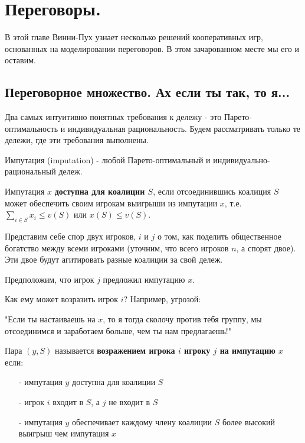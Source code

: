 \section{Переговоры.}

В этой главе Винни-Пух узнает несколько решений кооперативных игр, основанных на моделировании переговоров. В этом зачарованном месте мы его и оставим.

\subsection{Переговорное множество. Ах если ты так, то я...}

Два самых интуитивно понятных требования к дележу - это Парето-оптимальность и индивидуальная рациональность. Будем рассматривать только те дележи, где эти требования выполнены.

\begin{definition} Импутация (imputation) - любой Парето-оптимальный и индивидуально-рациональный дележ.
\end{definition}

\begin{definition}
Импутация $x$ \textbf{доступна для коалиции $S$}, если отсоединившись коалиция $S$ может обеспечить своим игрокам выигрыши из импутации $x$, т.е. $\sum_{i\in S}x_{i}\leq v(S)$ или $x(S)\leq v(S)$.
\end{definition}

Представим себе спор двух игроков, $i$ и $j$ о том, как поделить общественное богатство между всеми игроками (уточним, что всего игроков $n$, а спорят двое). Эти двое будут агитировать разные коалиции за свой дележ.

Предположим, что игрок $j$ предложил импутацию $x$. 

Как ему может возразить игрок $i$? Например, угрозой:

"Если ты настаиваешь на $x$, то я тогда сколочу против тебя группу, мы отсоединимся и заработаем больше, чем ты нам предлагаешь!"

\begin{definition}
Пара $(y,S)$ называется \textbf{возражением игрока $i$ игроку $j$ на импутацию $x$} если:
\begin{itemize}
\item[-] импутация $y$ доступна для коалиции $S$
\item[-] игрок $i$ входит в $S$, а $j$ не входит в $S$
\item[-] импутация $y$ обеспечивает каждому члену коалиции $S$ более высокий выигрыш чем импутация $x$
\end{itemize}
\end{definition}

